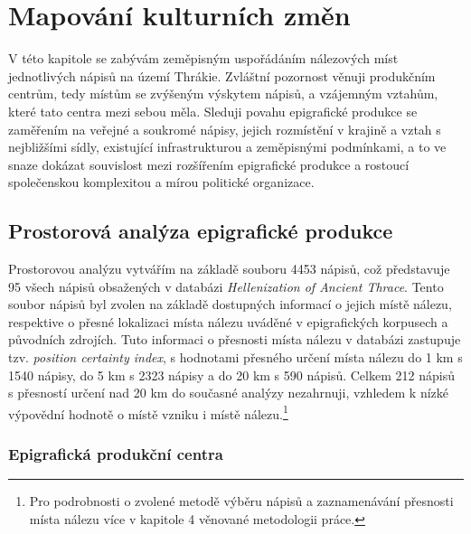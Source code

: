 \chapter{Mapování kulturních změn}
V této kapitole se zabývám zeměpisným uspořádáním nálezových míst jednotlivých nápisů na území Thrákie. Zvláštní pozornost věnuji produkčním centrům, tedy místům se zvýšeným výskytem nápisů, a vzájemným vztahům, které tato centra mezi sebou měla. Sleduji povahu epigrafické produkce se zaměřením na veřejné a soukromé nápisy, jejich rozmístění v krajině a vztah s nejbližšími sídly, existující infrastrukturou a zeměpisnými podmínkami, a to ve snaze dokázat souvislost mezi rozšířením epigrafické produkce a rostoucí společenskou komplexitou a mírou politické organizace.

\section[prostorová-analýza-epigrafické-produkce]{Prostorová analýza epigrafické produkce}

Prostorovou analýzu vytvářím na základě souboru 4453 nápisů, což představuje 95  všech nápisů obsažených v databázi {\em Hellenization of Ancient Thrace}. Tento soubor nápisů byl zvolen na základě dostupných informací o jejich místě nálezu, respektive o přesné lokalizaci místa nálezu uváděné v epigrafických korpusech a původních zdrojích. Tuto informaci o přesnosti místa nálezu v databázi zastupuje tzv. {\em position certainty index}, s hodnotami přesného určení místa nálezu do 1 km s 1540 nápisy, do 5 km s 2323 nápisy a do 20 km s 590 nápisů. Celkem 212 nápisů s přesností určení nad 20 km do současné analýzy nezahrnuji, vzhledem k nízké výpovědní hodnotě o místě vzniku i místě nálezu.\footnote{Pro podrobnosti o zvolené metodě výběru nápisů a zaznamenávání přesnosti místa nálezu více v kapitole 4 věnované metodologii práce.}

\subsection[epigrafická-produkční-centra-1]{Epigrafická produkční centra}

